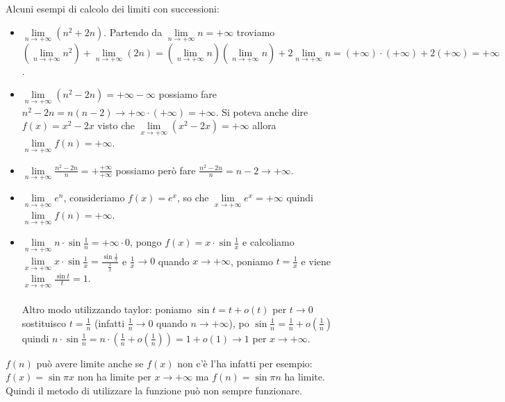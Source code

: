 \begin{example}
Alcuni esempi di calcolo dei limiti con successioni:
\begin{itemize}
    \item $\lim\limits_{n\to +\infty}(n^2 + 2n)$. Partendo da $\lim\limits_{n\to +\infty}n = +\infty$ troviamo $(\lim\limits_{n\to +\infty}n^2) + \lim\limits_{n\to +\infty}(2n) = (\lim\limits_{n\to +\infty}n)(\lim\limits_{n\to +\infty}n) + 2 \lim\limits_{n\to +\infty}n = (+\infty) \cdot (+\infty) + 2(+\infty) = +\infty$.
    \item $\lim\limits_{n\to +\infty}(n^2 - 2n) = +\infty - \infty$ possiamo fare $n^2 - 2n = n(n-2) \to +\infty \cdot (+\infty) = +\infty$. Si poteva anche dire $f(x) = x^2 - 2x$ visto che $\lim\limits_{x\to +\infty} (x^2 - 2x)=+\infty$ allora $\lim\limits_{n\to +\infty}f(n) = +\infty$.
    \item $\lim\limits_{n\to +\infty}\frac{n^2 - 2n}{n} = +\frac{+\infty}{+\infty}$ possiamo però fare $\frac{n^2 - 2n}{n} = n-2 \to +\infty$.
    \item $\lim\limits_{n\to +\infty}e^n$, consideriamo $f(x) = e^x$, so che $\lim\limits_{x\to +\infty}e^x = +\infty$ quindi $\lim\limits_{n\to +\infty}f(n) = +\infty$.
    \item $\lim\limits_{n\to +\infty}n\cdot \sin\frac{1}{n} = +\infty \cdot 0$, pongo $f(x) = x \cdot \sin\frac{1}{x}$ e calcoliamo $\lim\limits_{x\to +\infty}x\cdot \sin\frac{1}{x} = \frac{\sin\frac{1}{x}}{\frac{1}{x}}$ e $\frac{1}{x} \to 0$ quando $x\to +\infty$, poniamo $t = \frac{1}{x}$ e viene $\lim\limits_{x\to +\infty}\frac{\sin{t}}{t} = 1$.\\\\
    Altro modo utilizzando taylor: poniamo $\sin{t} = t + o(t)$ per $t\to 0$ sostituisco $t=\frac{1}{n}$ (infatti $\frac{1}{n}\to 0$ quando $n\to +\infty$), po $\sin{\frac{1}{n}} = \frac{1}{n} + o(\frac{1}{n})$ quindi $n\cdot \sin{\frac{1}{n}} = n \cdot (\frac{1}{n} + o(\frac{1}{n})) = 1 + o(1) \to 1$ per $x\to +\infty$.
\end{itemize}
\end{example}

\begin{observation}
$f(n)$ può avere limite anche se $f(x)$ non c'è l'ha infatti per esempio:
$f(x) = \sin{\pi x}$ non ha limite per $x\to +\infty$ ma $f(n) = \sin{\pi n}$ ha limite. \\
Quindi il metodo di utilizzare la funzione può non sempre funzionare.
\end{observation}

